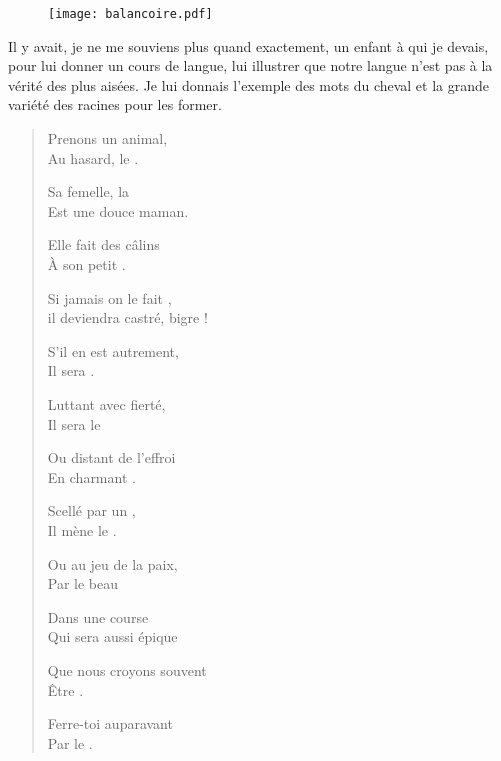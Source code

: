 \begin{figure}[h]
  \centering
  \texttt{[image: balancoire.pdf]}
  \captionsetup{labelformat=empty}
  \caption[Idéotexte de ]{}
\end{figure}

\begin{prose}
  Il y avait, je ne me souviens plus quand exactement, un enfant à qui je devais, pour lui donner un cours de langue, lui illustrer que notre langue n’est pas à la vérité des plus aisées. Je lui donnais l’exemple des mots du cheval et la grande variété des racines pour les former.
\end{prose}


\begin{verse}%
  \distique%
  Prenons un animal,\\  %
  Au hasard, le .

  Sa femelle, la \\  %
  Est une douce maman.

  Elle fait des câlins\\  %
  À son petit .

  Si jamais on le fait ,\\  %
  il deviendra castré, bigre !

  S’il en est autrement,\\  %
  Il sera .

  Luttant avec fierté,\\  %
  Il sera le 

  Ou distant de l’effroi\\  %
  En charmant .

  Scellé par un ,\\  %
  Il mène le .

  Ou au jeu de la paix,\\  %
  Par le beau 

  Dans une course \\  %
  Qui sera aussi épique

  Que nous croyons souvent\\  %
  Être .

  Ferre-toi auparavant\\  %
  Par le .
\end{verse}



